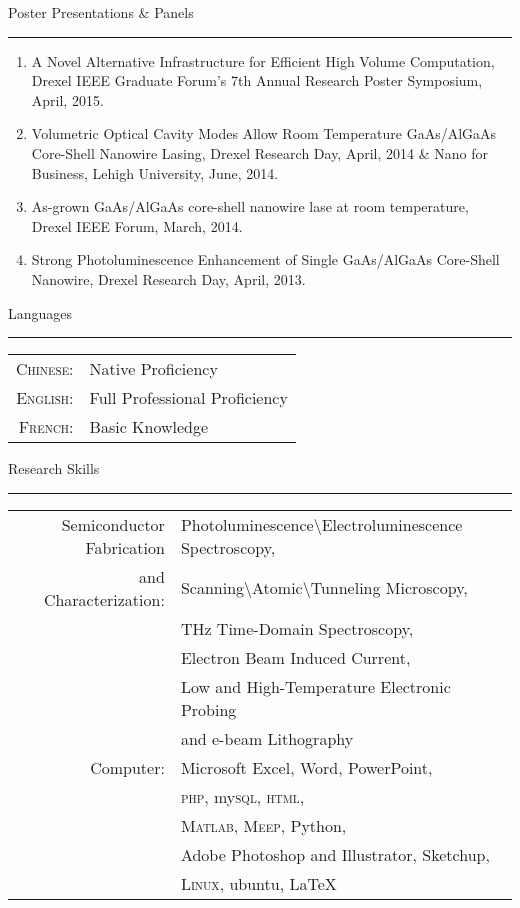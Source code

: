 \begin{vita}
{\Large\scshape\raggedright{Poster Presentations \& Panels}}
\newline
\rule{\textwidth}{1pt}
\begin{enumerate}
\item A Novel Alternative Infrastructure for Efficient High Volume Computation, Drexel IEEE Graduate Forum’s 7th Annual Research Poster Symposium, April, 2015.
\item Volumetric Optical Cavity Modes Allow Room Temperature GaAs/AlGaAs Core-Shell Nanowire Lasing, Drexel Research Day, April, 2014 \& Nano for Business, Lehigh University, June, 2014.
\item As-grown GaAs/AlGaAs core-shell nanowire lase at room temperature, Drexel IEEE Forum, March, 2014.
\item Strong Photoluminescence Enhancement of Single GaAs/AlGaAs Core-Shell Nanowire, Drexel Research Day, April, 2013.
\end{enumerate}


{\Large\scshape\raggedright{Languages}}
\newline
\rule{\textwidth}{1pt}
\begin{tabular}{rl}
\textsc{Chinese:}&Native Proficiency\\
\textsc{English:}&Full Professional Proficiency\\
\textsc{French:}&Basic Knowledge\\
\end{tabular}


{\Large\scshape\raggedright{Research Skills}}
\newline
\rule{\textwidth}{1pt}
\begin{tabular}{rl}
 Semiconductor Fabrication & Photoluminescence\textbackslash Electroluminescence Spectroscopy, \\
 and Characterization:& Scanning\textbackslash Atomic\textbackslash Tunneling Microscopy, \\
 & THz Time-Domain Spectroscopy,\\
 & Electron Beam Induced Current,\\ 
 & Low and High-Temperature Electronic Probing \\
 & and e-beam Lithography\\
Computer:& Microsoft Excel, Word, PowerPoint, \\
& \textsc{php}, my\textsc{sql}, \textsc{html},  \\
& \textsc{Matlab}, \textsc{Meep}, Python, \\
& Adobe Photoshop and Illustrator, Sketchup, \\ 
& \textsc{Linux}, ubuntu, {\LaTeX}\\
\end{tabular}


\end{vita}
